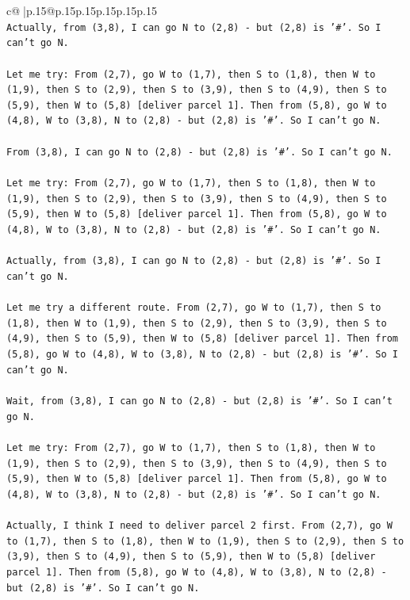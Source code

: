 \documentclass{article}
\begin{document}
{\begin{supertabular}{c@{$\;$}|p{.15\linewidth}@{}p{.15\linewidth}p{.15\linewidth}p{.15\linewidth}p{.15\linewidth}p{.15\linewidth}}
{{{\\ 
\texttt{Actually, from (3,8), I can go N to (2,8) {-} but (2,8) is '\#'. So I can't go N.} \\
\\ 
\texttt{Let me try: From (2,7), go W to (1,7), then S to (1,8), then W to (1,9), then S to (2,9), then S to (3,9), then S to (4,9), then S to (5,9), then W to (5,8) {[}deliver parcel 1{]}. Then from (5,8), go W to (4,8), W to (3,8), N to (2,8) {-} but (2,8) is '\#'. So I can't go N.} \\
\\ 
\texttt{From (3,8), I can go N to (2,8) {-} but (2,8) is '\#'. So I can't go N.} \\
\\ 
\texttt{Let me try: From (2,7), go W to (1,7), then S to (1,8), then W to (1,9), then S to (2,9), then S to (3,9), then S to (4,9), then S to (5,9), then W to (5,8) {[}deliver parcel 1{]}. Then from (5,8), go W to (4,8), W to (3,8), N to (2,8) {-} but (2,8) is '\#'. So I can't go N.} \\
\\ 
\texttt{Actually, from (3,8), I can go N to (2,8) {-} but (2,8) is '\#'. So I can't go N.} \\
\\ 
\texttt{Let me try a different route. From (2,7), go W to (1,7), then S to (1,8), then W to (1,9), then S to (2,9), then S to (3,9), then S to (4,9), then S to (5,9), then W to (5,8) {[}deliver parcel 1{]}. Then from (5,8), go W to (4,8), W to (3,8), N to (2,8) {-} but (2,8) is '\#'. So I can't go N.} \\
\\ 
\texttt{Wait, from (3,8), I can go N to (2,8) {-} but (2,8) is '\#'. So I can't go N.} \\
\\ 
\texttt{Let me try: From (2,7), go W to (1,7), then S to (1,8), then W to (1,9), then S to (2,9), then S to (3,9), then S to (4,9), then S to (5,9), then W to (5,8) {[}deliver parcel 1{]}. Then from (5,8), go W to (4,8), W to (3,8), N to (2,8) {-} but (2,8) is '\#'. So I can't go N.} \\
\\ 
\texttt{Actually, I think I need to deliver parcel 2 first. From (2,7), go W to (1,7), then S to (1,8), then W to (1,9), then S to (2,9), then S to (3,9), then S to (4,9), then S to (5,9), then W to (5,8) {[}deliver parcel 1{]}. Then from (5,8), go W to (4,8), W to (3,8), N to (2,8) {-} but (2,8) is '\#'. So I can't go N.} \\
}}}
\end{supertabular}}
\end{document}
